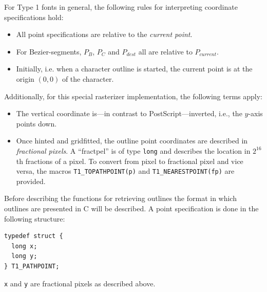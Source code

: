 For Type 1 fonts in general, the following rules for interpreting coordinate
specifications hold:
\begin{itemize}
\item All point specifications are relative to the {\em current
    point}. 
\item For Bezier-segments, $P_{B}$, $P_{C}$ and $P_{dest}$ all are relative to
  $P_{current}$.
\item Initially, i.e. when a character outline is started, the current point
  is at the origin $(0,0)$ of the character.
\end{itemize}
Additionally, for this special rasterizer implementation, the following terms
apply: 
\begin{itemize}
\item The vertical coordinate is---in contrast to PostScript---inverted, i.e.,
  the $y$-axis points down. 
\item Once hinted and gridfitted, the outline point coordinates are described
  in {\em fractional pixels}. A ``fractpel'' is of type \verb+long+ and
  describes the location in $2^{16}$th fractions of a pixel. To convert from
  pixel to fractional pixel and vice versa, the macros
  \verb+T1_TOPATHPOINT(p)+ and
  \verb+T1_NEARESTPOINT(fp)+ are provided. 
\end{itemize}

Before describing the functions for retrieving outlines the format in which
outlines are presented in C will be described. A point specification is done
in the following structure:  
\begin{verbatim}
typedef struct {
  long x;
  long y;
} T1_PATHPOINT;
\end{verbatim}
\verb+x+ and \verb+y+ are fractional pixels as described above.

